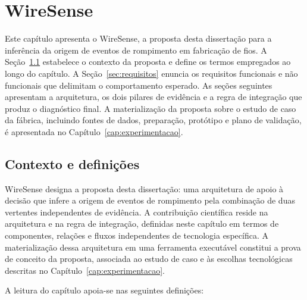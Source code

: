 \chapter{WireSense}
\label{cap:proposta}


Este capítulo apresenta o WireSense, a proposta desta dissertação para a inferência da origem de eventos de rompimento em fabricação de fios. A Seção~\ref{sec:contexto_definicoes} estabelece o contexto da proposta e define os termos empregados ao longo do capítulo. A Seção~\ref{sec:requisitos} enuncia os requisitos funcionais e não funcionais que delimitam o comportamento esperado. As seções seguintes apresentam a arquitetura, os dois pilares de evidência e a regra de integração que produz o diagnóstico final. A materialização da proposta sobre o estudo de caso da fábrica, incluindo fontes de dados, preparação, protótipo e plano de validação, é apresentada no Capítulo~\ref{cap:experimentacao}.


\section{Contexto e definições}
\label{sec:contexto_definicoes}

WireSense designa a proposta desta dissertação: uma arquitetura de apoio à decisão que infere a origem de eventos de rompimento pela combinação de duas vertentes independentes de evidência. A contribuição científica reside na arquitetura e na regra de integração, definidas neste capítulo em termos de componentes, relações e fluxos independentes de tecnologia específica. A materialização dessa arquitetura em uma ferramenta executável constitui a prova de conceito da proposta, associada ao estudo de caso e às escolhas tecnológicas descritas no Capítulo~\ref{cap:experimentacao}.

A leitura do capítulo apoia-se nas seguintes definições:

